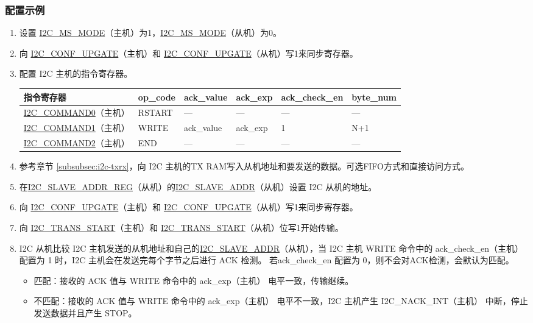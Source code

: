 \documentclass[main\_\_CN.tex]{subfiles}
\begin{document}
\subsubsection{配置示例}
\begin{enumerate}
\item 设置 \hyperref[fielddesc:I2CMSMODE]{I2C\_MS\_MODE}（主机）为1，\hyperref[fielddesc:I2CMSMODE]{I2C\_MS\_MODE}（从机）为0。
\item 向 \hyperref[fielddesc:I2CCONFUPGATE]{I2C\_CONF\_UPGATE}（主机）和 \hyperref[fielddesc:I2CCONFUPGATE]{I2C\_CONF\_UPGATE}（从机）写1来同步寄存器。
\item 配置 I2C 主机的指令寄存器。
\begin{longtable}{ | p{4cm} | p{2cm} | p{2cm} | p{2cm} |p{2cm} | p{2cm} |}
\hline\rowcolor{lightgray}
指令寄存器& op\_code & ack\_value&ack\_exp&ack\_check\_en&byte\_num  \\ \hline
\hyperref[fielddesc:I2CCOMMAND0]{I2C\_COMMAND0}（主机）& RSTART& ---&---&---&---  \\ \hline
\hyperref[fielddesc:I2CCOMMAND1]{I2C\_COMMAND1}（主机）& WRITE& ack\_value&ack\_exp&1&N+1  \\ \hline
\hyperref[fielddesc:I2CCOMMAND2]{I2C\_COMMAND2}（主机）& END& ---&---&---&---  \\ \hline
\end{longtable}
\item 参考章节 \ref{subsubsec:i2c-txrx}，向 I2C 主机的TX RAM写入从机地址和要发送的数据。可选FIFO方式和直接访问方式。
\item 在\hyperref[regdesc:I2CSLAVEADDRREG]{I2C\_SLAVE\_ADDR\_REG}（从机）的\hyperref[fielddesc:I2CSLAVEADDR]{I2C\_SLAVE\_ADDR}（从机）设置 I2C 从机的地址。
\item 向 \hyperref[fielddesc:I2CCONFUPGATE]{I2C\_CONF\_UPGATE}（主机）和 \hyperref[fielddesc:I2CCONFUPGATE]{I2C\_CONF\_UPGATE}（从机）写1来同步寄存器。
\item 向 \hyperref[fielddesc:I2CTRANSSTART]{I2C\_TRANS\_START}（主机）和 \hyperref[fielddesc:I2CTRANSSTART]{I2C\_TRANS\_START}（从机）位写1开始传输。
\item I2C 从机比较 I2C 主机发送的从机地址和自己的\hyperref[fielddesc:I2CSLAVEADDR]{I2C\_SLAVE\_ADDR}（从机），当 I2C 主机 WRITE 命令中的 ack\_check\_en（主机） 配置为 1 时，I2C 主机会在发送完每个字节之后进行 ACK 检测。 若ack\_check\_en 配置为 0，则不会对ACK检测，会默认为匹配。
\begin{itemize}
\item 匹配：接收的 ACK 值与 WRITE 命令中的 ack\_exp（主机） 电平一致，传输继续。
\item 不匹配：接收的 ACK 值与 WRITE 命令中的 ack\_exp（主机） 电平不一致，I2C 主机产生 I2C\_NACK\_INT（主机） 中断，停止发送数据并且产生 STOP。
\end{itemize}


\end{enumerate}
\end{document}
